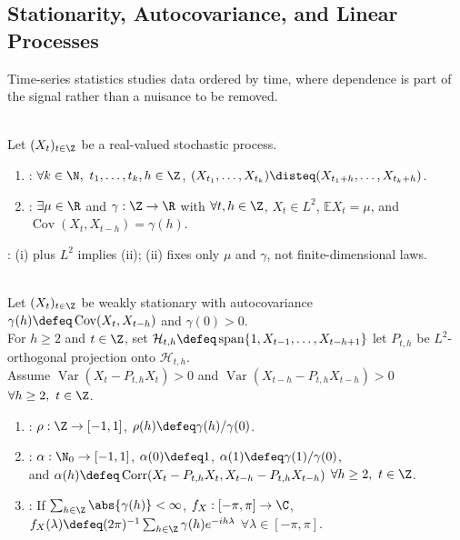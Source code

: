 \subsection{Stationarity, Autocovariance, and Linear Processes}

Time-series statistics studies data ordered by time, where dependence is part of the signal rather than a nuisance to be removed.

\begin{definition} \label{def:strict-and-weak-stationarity} \\
Let $(X_t)_{t\in\Z}$ be a real-valued stochastic process.
\begin{enumerate}[label=(\roman*)]
\setlength{\itemsep}{0pt}
\item {}: $\forall k\in\N,\ t_1,\ldots,t_k,h\in\Z$, $(X_{t_1},\ldots,X_{t_k})\disteq(X_{t_1+h},\ldots,X_{t_k+h})$.
\item {}: $\exists\mu\in\R$ and $\gamma:\Z\to\R$ with $\forall t,h\in\Z$, $X_t\in L^2$, $\mathbb{E}X_t=\mu$, and $\operatorname{Cov}(X_t,X_{t-h})=\gamma(h)$.
\end{enumerate}
: (i) plus $L^2$ implies (ii); (ii) fixes only $\mu$ and $\gamma$, not finite-dimensional laws.
\end{definition}

\begin{definition} \label{def:acf-pacf-and-spectral-density} \\
Let $(X_t)_{t\in\Z}$ be weakly stationary with autocovariance $\gamma(h)\defeq\operatorname{Cov}(X_t,X_{t-h})$ and $\gamma(0)>0$.\\
For $h\geq2$ and $t\in\Z$, set $\mathcal{H}_{t,h}\defeq\operatorname{span}\{1,X_{t-1},\ldots,X_{t-h+1}\}$ let $P_{t,h}$ be $L^2$-orthogonal projection onto $\mathcal{H}_{t,h}$.\\
Assume $\operatorname{Var}(X_t-P_{t,h}X_t)>0$ and $\operatorname{Var}(X_{t-h}-P_{t,h}X_{t-h})>0$ $\forall h\geq2,\ t\in\Z$.
\begin{enumerate}[label=(\roman*)]
\setlength{\itemsep}{0pt}
\item {}: $\rho:\Z\to[-1,1]$, $\rho(h)\defeq\gamma(h)/\gamma(0)$.
\item {}: $\alpha:\N_0\to[-1,1]$, $\alpha(0)\defeq1$, $\alpha(1)\defeq\gamma(1)/\gamma(0)$,\\
and $\alpha(h)\defeq\operatorname{Corr}(X_t-P_{t,h}X_t,X_{t-h}-P_{t,h}X_{t-h})$ $\forall h\geq2,\ t\in\Z$.
\item {}: If $\sum_{h\in\Z}\abs{\gamma(h)}<\infty$, $f_X:[-\pi,\pi]\to\C$, $f_X(\lambda)\defeq(2\pi)^{-1}\sum_{h\in\Z}\gamma(h)e^{-ih\lambda}$ $\forall\lambda\in[-\pi,\pi]$.
\end{enumerate}
\end{definition}

